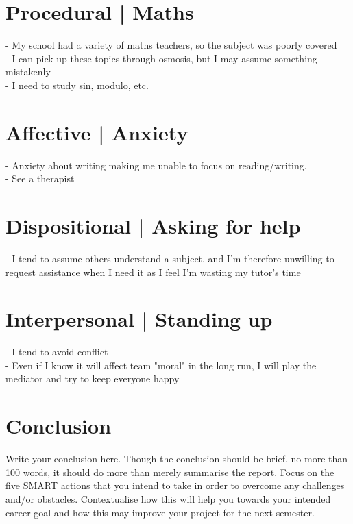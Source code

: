 \documentclass{scrartcl}
\begin{document}
\section{Procedural | Maths}
- My school had a variety of maths teachers, so the subject was poorly covered\\
- I can pick up these topics through osmosis, but I may assume something mistakenly\\
- I need to study sin, modulo, etc.\\

\section{Affective | Anxiety}
- Anxiety about writing making me unable to focus on reading/writing.\\
- See a therapist\\

\section{Dispositional | Asking for help}
- I tend to assume others understand a subject, and I'm therefore unwilling to request assistance when I need it as I feel I'm wasting my tutor's time\\


\section{Interpersonal | Standing up}
- I tend to avoid conflict\\
- Even if I know it will affect team "moral" in the long run, I will play the mediator and try to keep everyone happy\\

\section{Conclusion}

Write your conclusion here. Though the conclusion should be brief, no more than 100 words, it should do more than merely summarise the report. Focus on the five SMART actions that you intend to take in order to overcome any challenges and/or obstacles. Contextualise how this will help you towards your intended career goal and how this may improve your project for the next semester.



\end{document}

